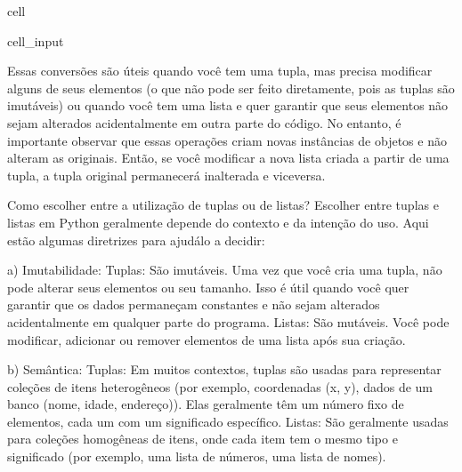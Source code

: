 \documentclass[letterpaper,10pt,english]{jupyterBook}
\begin{document}
\begin{sphinxuseclass}{cell}\begin{sphinxVerbatimInput}

\begin{sphinxuseclass}{cell_input}
\begin{sphinxVerbatim}[commandchars=\\\{\}]
 
\end{sphinxVerbatim}

\end{sphinxuseclass}\end{sphinxVerbatimInput}

\end{sphinxuseclass}
\sphinxAtStartPar
Essas conversões são úteis quando você tem uma tupla, mas precisa modificar alguns de seus elementos (o que não pode ser feito diretamente, pois as tuplas são imutáveis) ou quando você tem uma lista e quer garantir que seus elementos não sejam alterados acidentalmente em outra parte do código.  No entanto, é importante observar que essas operações criam novas instâncias de objetos e não alteram as originais. Então, se você modificar a nova lista criada a partir de uma tupla, a tupla original permanecerá inalterada e vice\sphinxhyphen{}versa.

\sphinxAtStartPar
Como escolher entre a utilização de tuplas ou de listas?
Escolher entre tuplas e listas em Python geralmente depende do contexto e da intenção do uso. Aqui estão algumas diretrizes para ajudá\sphinxhyphen{}lo a decidir:

\sphinxAtStartPar
a) Imutabilidade:
Tuplas: São imutáveis. Uma vez que você cria uma tupla, não pode alterar seus elementos ou seu tamanho. Isso é útil quando você quer garantir que os dados permaneçam constantes e não sejam alterados acidentalmente em qualquer parte do programa.
Listas: São mutáveis. Você pode modificar, adicionar ou remover elementos de uma lista após sua criação.

\sphinxAtStartPar
b) Semântica:
Tuplas: Em muitos contextos, tuplas são usadas para representar coleções de itens heterogêneos (por exemplo, coordenadas (x, y), dados de um banco (nome, idade, endereço)). Elas geralmente têm um número fixo de elementos, cada um com um significado específico.
Listas: São geralmente usadas para coleções homogêneas de itens, onde cada item tem o mesmo tipo e significado (por exemplo, uma lista de números, uma lista de nomes).
\end{document}
